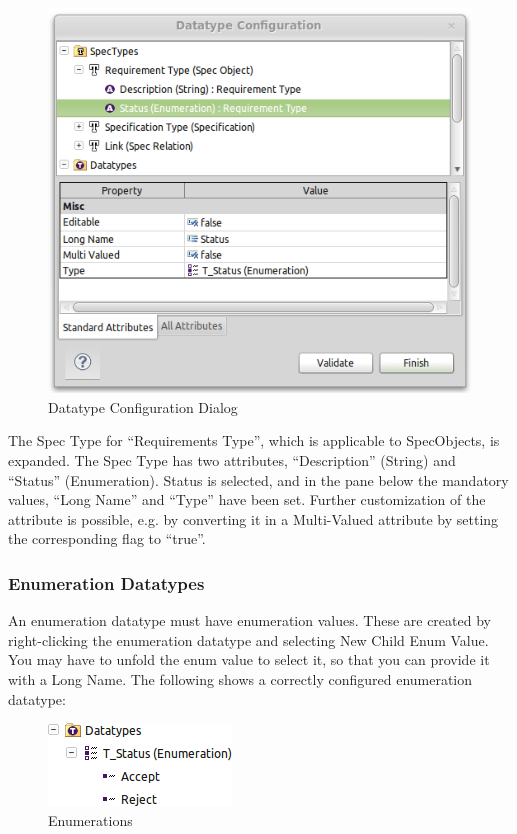 \begin{figure}[h!]
\centering     
\includegraphics[width=0.8\linewidth]{../rmf-images/pror_datatype_configuration.png}
\caption{Datatype Configuration Dialog}      
\label{fig:DatatypeConfig}
\end{figure}

The Spec Type for ``Requirements Type'', which is applicable to
SpecObjects, is expanded.  The Spec Type has two attributes,
``Description'' (String) and ``Status'' (Enumeration).  Status is
selected, and in the pane below the mandatory values, ``Long Name'' and
``Type'' have been set.  Further customization of the attribute is
possible, e.g.  by converting it in a Multi-Valued attribute by setting
the corresponding flag to ``true''.

\subsubsection{Enumeration Datatypes}

An enumeration datatype must have enumeration values.  These are created
by right-clicking the enumeration datatype and selecting New Child
\textbar{} Enum Value.  You may have to unfold the enum value to select
it, so that you can provide it with a Long Name.  The following shows a
correctly configured enumeration datatype:

\begin{figure}[h!]
\centering      
\includegraphics[width=0.4\linewidth]{../rmf-images/rmf_enumeration.png}
\caption{Enumerations}      
\label{fig:Enumerations}
\end{figure}

